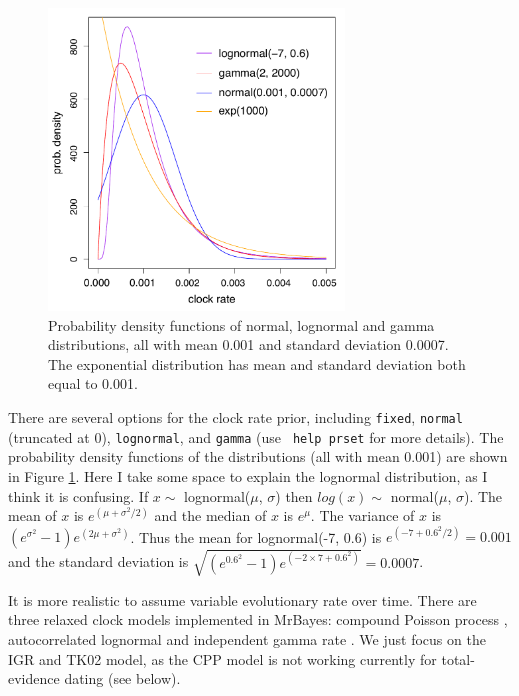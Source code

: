 \documentclass[12pt]{article}
\begin{document}
\begin{figure}[h]
\includegraphics[width=0.7\textwidth]{figures/clockr.pdf}
\caption{Probability density functions of normal, lognormal and gamma distributions, all with mean 0.001 and standard deviation 0.0007. The exponential distribution has mean and standard deviation both equal to 0.001.
}
\label{fig_clockr}
\end{figure}

\noindent There are several options for the clock rate prior, including {\tt fixed}, {\tt normal} (truncated at 0), {\tt lognormal}, and {\tt gamma} (use {\tt \color{red} help prset} for more details).
The probability density functions of the distributions (all with mean 0.001) are shown in Figure \ref{fig_clockr}.
Here I take some space to explain the lognormal distribution, as I think it is confusing.
If $x \sim $ lognormal($\mu$, $\sigma$) then $log(x) \sim $ normal($\mu$, $\sigma$).
The mean of $x$ is $e^{(\mu + \sigma^2/2)}$ and the median of $x$ is $e^{\mu}$.
The variance of $x$ is $(e^{\sigma^2} -1) e^{(2\mu + \sigma^2)}$.
Thus the mean for lognormal(-7, 0.6) is $e^{(-7 + 0.6^2/2)} = 0.001$ and the standard deviation is $\sqrt{(e^{0.6^2} -1) e^{(-2 \times 7 + 0.6^2)}} = 0.0007$.

It is more realistic to assume variable evolutionary rate over time. 
There are three relaxed clock models implemented in MrBayes: compound Poisson process \citep[CPP,][]{Huelsenbeck:2000ic}, autocorrelated lognormal \citep[TK02,][]{Thorne:2002il} and independent gamma rate \citep[IGR,][]{Lepage:2007bq}.
We just focus on the IGR and TK02 model, as the CPP model is not working currently for total-evidence dating (see below). 
\end{document}
